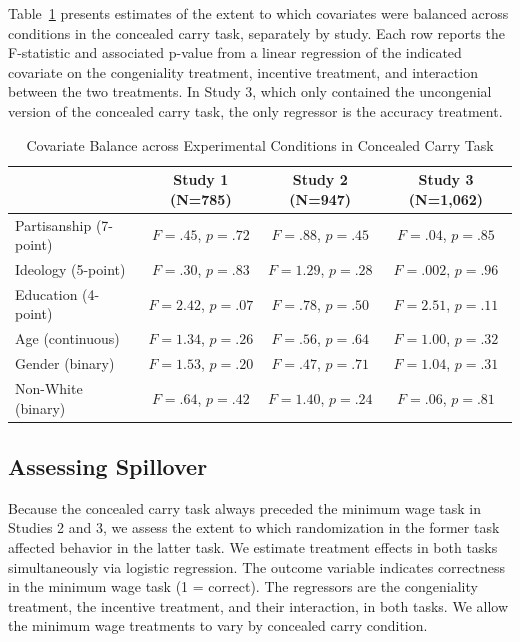 \documentclass[12pt, letterpaper]{article}
\begin{document}
Table~\ref{tab:balance} presents estimates of the extent to which covariates were balanced across conditions in the concealed carry task, separately by study. Each row reports the F-statistic and associated p-value from a linear regression of the indicated covariate on the congeniality treatment, incentive treatment, and interaction between the two treatments. In Study 3, which only contained the uncongenial version of the concealed carry task, the only regressor is the accuracy treatment.

\vspace{-3mm}
\singlespacing
\begin{table}[h]
\centering
\caption{Covariate Balance across Experimental Conditions in Concealed Carry Task} \label{tab:balance}
\begin{tabular}{| l c c c |}
\hline 
				& Study 1 (N=785)		& Study 2 (N=947)		& Study 3 (N=1,062)	\\ \hline
Partisanship (7-point)	& $F = .45$, $p = .72$	& $F = .88$, $p = .45$	& $F = .04$, $p = .85$ \\ 
Ideology (5-point)	& $F = .30$, $p = .83$	& $F = 1.29$, $p = .28$	& $F = .002$, $p = .96$ \\ 
Education (4-point)	& $F = 2.42$, $p = .07$	& $F = .78$, $p = .50$	& $F = 2.51$, $p = .11$ \\ 
Age (continuous)	& $F = 1.34$, $p = .26$	& $F = .56$, $p = .64$	& $F = 1.00$, $p = .32$ \\ 
Gender (binary)		& $F = 1.53$, $p = .20$	& $F = .47$, $p = .71$	& $F = 1.04$, $p = .31$ \\ 
Non-White (binary)	& $F = .64$, $p = .42$	& $F = 1.40$, $p = .24$	& $F = .06$, $p = .81$ \\ \hline
\end{tabular}
\end{table}
\doublespacing

\vspace{-5mm}
\subsection{Assessing Spillover}
\label{sec:spillover}

Because the concealed carry task always preceded the minimum wage task in Studies 2 and 3, we assess the extent to which randomization in the former task affected behavior in the latter task. We estimate treatment effects in both tasks simultaneously via logistic regression. The outcome variable indicates correctness in the minimum wage task (1 = correct). The regressors are the congeniality treatment, the incentive treatment, and their interaction, in both tasks. We allow the minimum wage treatments to vary by concealed carry condition.
\end{document}
